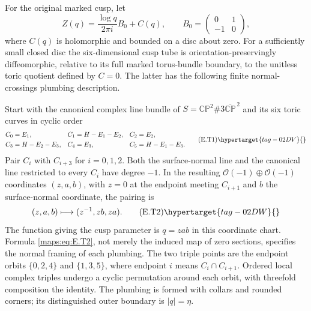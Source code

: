 \begin{proposition}\hypertarget{tag-02MJ}{}\label{maps:src:E.2.19}


For the original marked cusp, let
\[
 Z(q)=\frac{\log q}{2\pi i}B_0+C(q),\qquad
 B_0=\begin{pmatrix}0&1\\-1&0\end{pmatrix},
\]
where $C(q)$ is holomorphic and bounded on a disc about zero.
For a sufficiently small closed disc the six-dimensional
cusp tube is orientation-preservingly diffeomorphic, relative to
its full marked torus-bundle boundary, to the unitless toric
quotient defined by $C=0$.  The latter has the following finite
normal-crossings plumbing description.

Start with the canonical complex line bundle of
$S=\mathbb {CP}^2\#3\overline{\mathbb {CP}}^{\,2}$ and its six
toric curves in cyclic order
\[
 \begin{aligned}
 C_0&=E_1,& C_1&=H-E_1-E_2,& C_2&=E_2,\\
 C_3&=H-E_2-E_3,& C_4&=E_3,& C_5&=H-E_1-E_3.
 \end{aligned}
 \tag{E.T1}\hypertarget{tag-02DV}{}\label{maps:eq:E.T1}
\]
Pair $C_i$ with $C_{i+3}$ for $i=0,1,2$.  Both the surface-normal
line and the canonical line restricted to every $C_i$ have degree
$-1$.  In the resulting $\mathcal O(-1)\oplus\mathcal O(-1)$
coordinates $(z,a,b)$, with $z=0$ at the endpoint meeting
$C_{i+1}$ and $b$ the surface-normal coordinate, the pairing is
\[
             (z,a,b)\longmapsto(z^{-1},zb,za).
 \tag{E.T2}\hypertarget{tag-02DW}{}\label{maps:eq:E.T2}
\]
The function giving the cusp parameter is $q=zab$ in this
coordinate chart.  Formula \eqref{maps:eq:E.T2}, not merely the induced map
of zero sections, specifies the normal framing of each plumbing.
The two triple points are the endpoint orbits
$\{0,2,4\}$ and $\{1,3,5\}$, where endpoint $i$ means
$C_i\cap C_{i+1}$.  Ordered local complex triples undergo a
cyclic permutation around each orbit, with threefold composition
the identity.  The plumbing is formed with collars and rounded
corners; its distinguished outer boundary is $|q|=\eta$.

\end{proposition}


